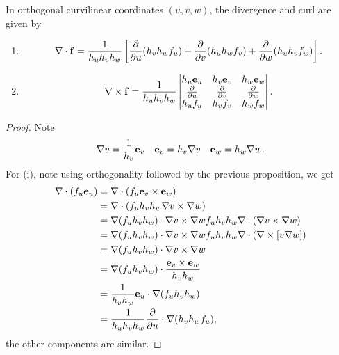 \documentclass[10pt, a4paper]{article}
\begin{document}
\begin{proposition}
    In orthogonal curvilinear coordinates $(u, v, w)$,
    the divergence and curl are given by
    \begin{enumerate}[label = (\roman*)]
        \item
        \[
        \mathbf{\nabla} \cdot \mathbf{f} = \frac{1}{h_uh_vh_w}\left[\frac{\partial }{\partial u}(h_vh_wf_u) + \frac{\partial }{\partial v}(h_uh_wf_v) + \frac{\partial }{\partial w}(h_uh_vf_w)\right].
        \]

        \item
        \[
        \mathbf{\nabla} \times \mathbf{f} = \frac{1}{h_uh_vh_w}\begin{vmatrix}
            h_u\mathbf{e}_u & h_v\mathbf{e}_v & h_w\mathbf{e}_w \\
            \frac{\partial }{\partial u} & \frac{\partial }{\partial v} & \frac{\partial }{\partial w} \\
            h_uf_u & h_vf_v & h_wf_w
        \end{vmatrix}.
        \]
    \end{enumerate}

    \begin{proof}
        Note
        \[
        \mathbf{\nabla} v = \frac{1}{h_v}\mathbf{e}_v\quad\mathbf{e}_v = h_v\mathbf{\nabla} v\quad\mathbf{e}_w = h_w\mathbf{\nabla} w.
        \]
        For
        (i),
        note using orthogonality followed by the previous proposition,
        we get
        \begin{align*}
            \mathbf{\nabla}  \cdot (f_u\mathbf{e}_u) &= \mathbf{\nabla} \cdot (f_u\mathbf{e}_v \times \mathbf{e}_w) \\
            &= \mathbf{\nabla} \cdot (f_uh_vh_w \mathbf{\nabla} v \times \mathbf{\nabla} w) \\
            &= \mathbf{\nabla}(f_uh_vh_w) \cdot \mathbf{\nabla} v \times \mathbf{\nabla} w f_uh_vh_w\mathbf{\nabla} \cdot (\mathbf{\nabla} v \times \mathbf{\nabla} w) \\
            &= \mathbf{\nabla}(f_uh_vh_w) \cdot \mathbf{\nabla} v \times \mathbf{\nabla} w f_uh_vh_w\mathbf{\nabla} \cdot (\mathbf{\nabla} \times [v \mathbf{\nabla} w]) \\
            &= \mathbf{\nabla}(f_uh_vh_w) \cdot \mathbf{\nabla} v \times \mathbf{\nabla} w  \\
            &= \mathbf{\nabla}(f_uh_vh_w) \cdot \frac{\mathbf{e}_v \times \mathbf{e}_w}{h_vh_w} \\
            &= \frac{1}{h_vh_w}\mathbf{e}_u \cdot \mathbf{\nabla}(f_uh_vh_w) \\
            &= \frac{1}{h_uh_vh_w}\frac{\partial }{\partial u} \cdot \mathbf{\nabla}(h_vh_wf_u),
        \end{align*}
        the other components are similar.


\end{proof}
\end{proposition}
\end{document}
